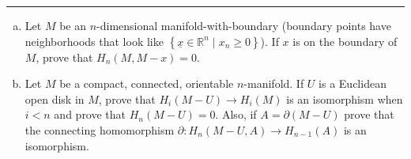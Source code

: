 \documentclass[letterpaper, 12pt]{article}
\begin{document}
\noindent\rule{7in}{2.8pt}
\begin{problem}{2}
\begin{enumerate}[(a)]
\item Let \(M\) be an \(n\)-dimensional manifold-with-boundary (boundary points have neighborhoods that look like \(\left\{ \underline{x}\in \mathbb{R}^n\mid x_n\geq 0 \right\}\)). If \(x\) is on the boundary of \(M\), prove that \(H_n(M,M-x)=0\).
\item Let \(M\) be a compact, connected, orientable \(n\)-manifold. If \(U\) is a Euclidean open disk in \(M\), prove that \(H_i(M-U)\rightarrow H_i(M)\) is an isomorphism when \(i<n\)  and prove that \(H_n(M-U)=0\). Also, if \(A=\partial (M-U)\) prove that the connecting homomorphism \(\partial:H_n(M-U,A)\rightarrow H_{n-1}(A)\) is an isomorphism. 
\end{enumerate}
\end{problem}
\end{document}
